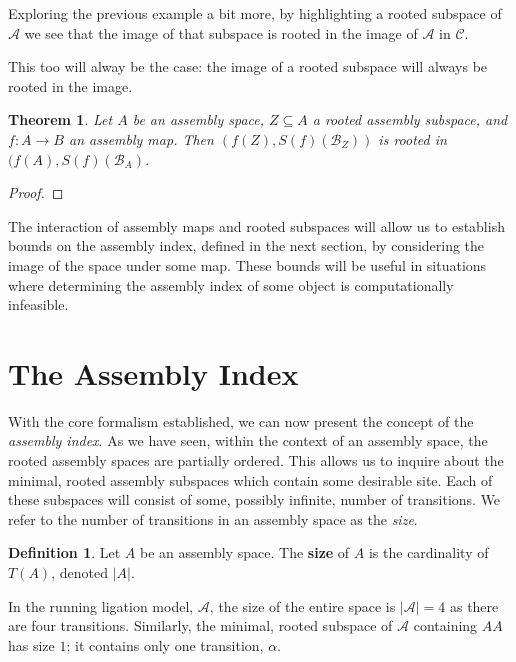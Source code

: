 \documentclass[aps,prd,onecolumn,nofootinbib,letterpaper,preprintnumbers,superscriptaddress,eqsecnum]{revtex4}
\newtheorem{theorem}{Theorem}
\theoremstyle{definition}
\newtheorem{definition}{Definition}
\newcommand{\B}{\mathcal{B}}
\newcommand{\C}{\mathcal{C}}
\newcommand{\A}{\mathcal{A}}
\newcommand{\red}[1]{{\color{red}#1}}
\newcommand{\TODO}[1]{\noindent\red{\textbf{TODO:}~#1}}
\begin{document}
Exploring the previous example a bit more, by highlighting a rooted subspace of $\A$ we see that the image of that subspace is rooted in the image of $\A$ in $\C$.

\TODO{Example Figure}

This too will alway be the case: the image of a rooted subspace will always be rooted in the image.
\begin{theorem}\label{thm:rooted-image}
    Let $A$ be an assembly space, $Z \subseteq A$ a rooted assembly subspace, and $f : A \rightarrow B$ an assembly map.
    Then $(f(Z), S(f)(\B_Z))$ is rooted in $(f(A), S(f)(\B_A)$.
\end{theorem}
\begin{proof}
    \TODO{Complete}
\end{proof}

The interaction of assembly maps and rooted subspaces will allow us to establish bounds on the assembly index, defined in the next section, by considering the image of the space under some map.
These bounds will be useful in situations where determining the assembly index of some object is computationally infeasible.

\section{The Assembly Index}\label{sec:assembly-index}

With the core formalism established, we can now present the concept of the \textit{assembly index}.
As we have seen, within the context of an assembly space, the rooted assembly spaces are partially ordered.
This allows us to inquire about the minimal, rooted assembly subspaces which contain some desirable site.
Each of these subspaces will consist of some, possibly infinite, number of transitions.
We refer to the number of transitions in an assembly space as the \textit{size}.
\begin{definition}\label{def:size}
    Let $A$ be an assembly space.
    The \textbf{size} of $A$ is the cardinality of $T(A)$, denoted $|A|$.
\end{definition}
In the running ligation model, $\A$, the size of the entire space is $|\A| = 4$ as there are four transitions.
Similarly, the minimal, rooted subspace of $\A$ containing $AA$ has size $1$; it contains only one transition, $\alpha$.
\end{document}
